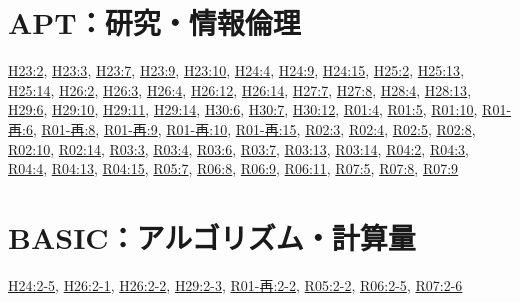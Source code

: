 \section{APT：研究・情報倫理}
\hyperref[q:h23-reg-apt-02]{H23:2}, \hyperref[q:h23-reg-apt-03]{H23:3}, \hyperref[q:h23-reg-apt-07]{H23:7}, \hyperref[q:h23-reg-apt-09]{H23:9}, \hyperref[q:h23-reg-apt-10]{H23:10}, \hyperref[q:h24-reg-apt-04]{H24:4}, \hyperref[q:h24-reg-apt-09]{H24:9}, \hyperref[q:h24-reg-apt-15]{H24:15}, \hyperref[q:h25-reg-apt-02]{H25:2}, \hyperref[q:h25-reg-apt-13]{H25:13}, \hyperref[q:h25-reg-apt-14]{H25:14}, \hyperref[q:h26-reg-apt-02]{H26:2}, \hyperref[q:h26-reg-apt-03]{H26:3}, \hyperref[q:h26-reg-apt-04]{H26:4}, \hyperref[q:h26-reg-apt-12]{H26:12}, \hyperref[q:h26-reg-apt-14]{H26:14}, \hyperref[q:h27-reg-apt-07]{H27:7}, \hyperref[q:h27-reg-apt-08]{H27:8}, \hyperref[q:h28-reg-apt-04]{H28:4}, \hyperref[q:h28-reg-apt-13]{H28:13}, \hyperref[q:h29-reg-apt-06]{H29:6}, \hyperref[q:h29-reg-apt-10]{H29:10}, \hyperref[q:h29-reg-apt-11]{H29:11}, \hyperref[q:h29-reg-apt-14]{H29:14}, \hyperref[q:h30-reg-apt-06]{H30:6}, \hyperref[q:h30-reg-apt-07]{H30:7}, \hyperref[q:h30-reg-apt-12]{H30:12}, \hyperref[q:r01-reg-apt-04]{R01:4}, \hyperref[q:r01-reg-apt-05]{R01:5}, \hyperref[q:r01-reg-apt-10]{R01:10}, \hyperref[q:r01-ret-apt-06]{R01-再:6}, \hyperref[q:r01-ret-apt-08]{R01-再:8}, \hyperref[q:r01-ret-apt-09]{R01-再:9}, \hyperref[q:r01-ret-apt-10]{R01-再:10}, \hyperref[q:r01-ret-apt-15]{R01-再:15}, \hyperref[q:r02-reg-apt-03]{R02:3}, \hyperref[q:r02-reg-apt-04]{R02:4}, \hyperref[q:r02-reg-apt-05]{R02:5}, \hyperref[q:r02-reg-apt-08]{R02:8}, \hyperref[q:r02-reg-apt-10]{R02:10}, \hyperref[q:r02-reg-apt-14]{R02:14}, \hyperref[q:r03-reg-apt-03]{R03:3}, \hyperref[q:r03-reg-apt-04]{R03:4}, \hyperref[q:r03-reg-apt-06]{R03:6}, \hyperref[q:r03-reg-apt-07]{R03:7}, \hyperref[q:r03-reg-apt-13]{R03:13}, \hyperref[q:r03-reg-apt-14]{R03:14}, \hyperref[q:r04-reg-apt-02]{R04:2}, \hyperref[q:r04-reg-apt-03]{R04:3}, \hyperref[q:r04-reg-apt-04]{R04:4}, \hyperref[q:r04-reg-apt-13]{R04:13}, \hyperref[q:r04-reg-apt-15]{R04:15}, \hyperref[q:r05-reg-apt-07]{R05:7}, \hyperref[q:r06-reg-apt-08]{R06:8}, \hyperref[q:r06-reg-apt-09]{R06:9}, \hyperref[q:r06-reg-apt-11]{R06:11}, \hyperref[q:r07-reg-apt-05]{R07:5}, \hyperref[q:r07-reg-apt-08]{R07:8}, \hyperref[q:r07-reg-apt-09]{R07:9}
\section{BASIC：アルゴリズム・計算量}
\hyperref[q:h24-reg-basic-2-5]{H24:2-5}, \hyperref[q:h26-reg-basic-2-1]{H26:2-1}, \hyperref[q:h26-reg-basic-2-2]{H26:2-2}, \hyperref[q:h29-reg-basic-2-3]{H29:2-3}, \hyperref[q:r01-ret-basic-2-2]{R01-再:2-2}, \hyperref[q:r05-reg-basic-2-2]{R05:2-2}, \hyperref[q:r06-reg-basic-2-5]{R06:2-5}, \hyperref[q:r07-reg-basic-2-6]{R07:2-6}
